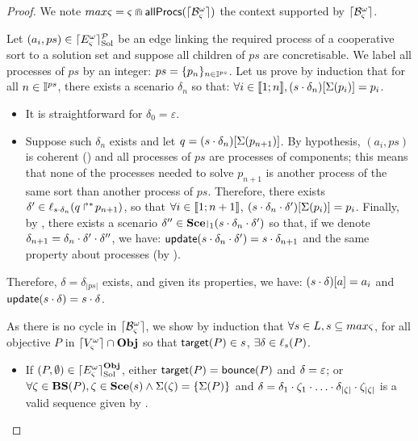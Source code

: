 \appendix


\begin{proof} 
We note $max\varsigma = \varsigma \Cap \mathsf{allProcs}(\lceil \mathcal{B}_\varsigma^\omega\rceil)$ the context supported by $\lceil \mathcal{B}_\varsigma^\omega\rceil$.

Let $(a_i, ps) \in \lceil E_\varsigma^\omega\rceil^{\mathcal{P}}_{\mathrm{Sol}}$ be an edge linking the required process of a cooperative sort to a solution set and suppose all children of $ps$ are concretisable.
We label all processes of $ps$ by an integer: $ps = \{ p_n \}_{n \in \mathbb{I}^{ps}}$.
Let us prove by induction that for all $n \in \mathbb{I}^{ps}$, there exists a scenario $\delta_n$ so that:
$\forall i \in \llbracket 1; n \rrbracket, {(s \cdot \delta_n)[\Sigma(p_i)]} = p_i$.
\begin{itemize}
  \item It is straightforward for $\delta_0 = \varepsilon$.
  \item Suppose such $\delta_n$ exists and let $q = {(s \cdot \delta_n)[\Sigma(p_{n+1})]}$.
    By hypothesis, $(a_i, ps)$ is coherent () and all processes of $ps$ are processes of components;
    this means that none of the processes needed to solve $p_{n+1}$ is another process of the same sort than another process of $ps$.
    Therefore, there exists $\delta' \in \ell_{s \cdot \delta_n}(\mbox{$q\Rsh^*\!p_{n+1}$})$,
    so that $\forall i \in \llbracket 1; n+1 \rrbracket$, ${(s \cdot \delta_n \cdot \delta')[\Sigma(p_{i})]} = p_{i}$.
    Finally, by , there exists a scenario $\delta'' \in \restriction{\Sce}{1}(s \PHplay \delta_n \PHplay \delta')$
    so that, if we denote $\delta_{n+1} = \delta_n \cdot \delta' \cdot \delta''$,
    we have: $\mathsf{update}(s \cdot \delta_n \cdot \delta') = s \cdot \delta_{n+1}$ and the same property about processes (by ).
\end{itemize}
Therefore, $\delta = \delta_{|ps|}$ exists, and given its properties, we have: ${(s \cdot \delta)[a]} = a_i$
and $\mathsf{update}(s \cdot \delta) = s \cdot \delta$.

As there is no cycle in $\lceil \mathcal{B}_\varsigma^\omega\rceil$, we show by induction that $\forall s\in L, s\subseteq max\varsigma$, 
for all objective $P$ in $\lceil V_\varsigma^\omega\rceil \cap \mathbf{Obj}$ so that $\mathsf{target}(P) \in s$,
$\exists \delta \in \ell_s(P)$.%
\begin{itemize}
  \item If $(P, \emptyset) \in \lceil E_\varsigma^\omega\rceil^{\mathbf{Obj}}_{\mathrm{Sol}}$, either $\mathsf{target}(P) = \mathsf{bounce}(P)$ and $\delta = \varepsilon$;
    or $\forall \zeta \in \mathbf{BS}(P), \zeta \in \mathbf{Sce}(s) \wedge \Sigma(\zeta) = \{ \Sigma(P) \}$
    and $\delta = \delta_1 \PHplay \zeta_1 \PHplay \dots \PHplay \delta_{|\zeta|} \PHplay \zeta_{|\zeta|}$ is a valid sequence given by .


\end{itemize}
\end{proof}
